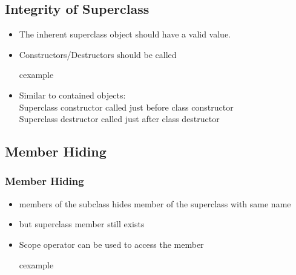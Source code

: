 \subsection{Integrity of Superclass}
\begin{frame}
\begin{itemize}
\item The inherent superclass object should have a valid value.
\item Constructors/Destructors should be called
\begin{beamercolorbox}{cexample}
\codeInhCons
\end{beamercolorbox}
\item Similar to contained objects:\\
	Superclass constructor called just before class constructor\\
	Superclass destructor called just after class destructor\\
\end{itemize}
\end{frame}

\subsection{Member Hiding}
\begin{frame}
\frametitle{Member Hiding}
\begin{itemize}
\item members of the subclass hides member of the superclass with same name
\item but superclass member still exists
\item Scope operator can be used to access the member
\begin{beamercolorbox}{cexample}
\codeInhHide
\end{beamercolorbox}
\end{itemize}
\end{frame}


